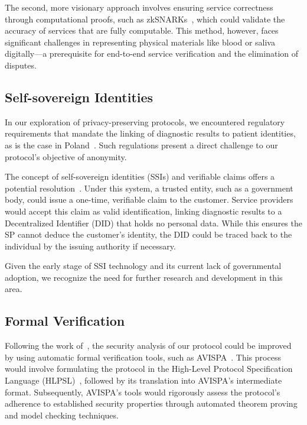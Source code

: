 \documentclass[pdftex,twocolumn,epjc3]{svjour3}
\begin{document}
The second, more visionary approach involves ensuring service correctness through computational proofs, such as zkSNARKs~\cite{ben-sassonSNARKsVerifyingProgram2013}, which could validate the accuracy of services that are fully computable. This method, however, faces significant challenges in representing physical materials like blood or saliva digitally—a prerequisite for end-to-end service verification and the elimination of disputes.

\subsection{Self-sovereign Identities}
In our exploration of privacy-preserving protocols, we encountered regulatory requirements that mandate the linking of diagnostic results to patient identities, as is the case in Poland~\cite{ministerstwozdrowiaRegulationMinisterHealth2006}. Such regulations present a direct challenge to our protocol's objective of anonymity.

The concept of self-sovereign identities (SSIs) and verifiable claims offers a potential resolution~\cite{muhleSurveyEssentialComponents2018}. Under this system, a trusted entity, such as a government body, could issue a one-time, verifiable claim to the customer. Service providers would accept this claim as valid identification, linking diagnostic results to a Decentralized Identifier (DID) that holds no personal data. While this ensures the SP cannot deduce the customer's identity, the DID could be traced back to the individual by the issuing authority if necessary.

Given the early stage of SSI technology and its current lack of governmental adoption, we recognize the need for further research and development in this area.

\subsection{Formal Verification}\label{sec:formal-verification}
Following the work of~\cite{birjoveanuFormalVerificationMultiparty2022}, the security analysis of our protocol could be improved by using automatic formal verification tools, such as AVISPA~\cite{armandoAVISPAToolAutomated2005}. This process would involve formulating the protocol in the High-Level Protocol Specification Language (HLPSL)~\cite{chevalierHighLevelProtocol2004}, followed by its translation into AVISPA's intermediate format. Subsequently, AVISPA's tools would rigorously assess the protocol's adherence to established security properties through automated theorem proving and model checking techniques.
\end{document}
